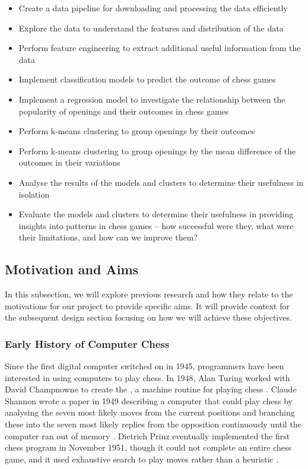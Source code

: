 \documentclass[a4paper, 11pt]{article}
\begin{document}
\begin{itemize}
    \setlength\itemsep{0em}
    \item Create a data pipeline for downloading and processing the data efficiently
    \item Explore the data to understand the features and distribution of the data
    \item Perform feature engineering to extract additional useful information from the data
    \item Implement classification models to predict the outcome of chess games
    \item Implement a regression model to investigate the relationship between the popularity of openings and their outcomes in chess games
    \item Perform k-means clustering to group openings by their outcomes
    \item Perform k-means clustering to group openings by the mean difference of the outcomes in their variations
    \item Analyse the results of the models and clusters to determine their usefulness in isolation
    \item Evaluate the models and clusters to determine their usefulness in providing insights into patterns in chess games -- how successful were they, what were their limitations, and how can we improve them?
\end{itemize}

\subsection{Motivation and Aims}
In this subsection, we will explore previous research and how they relate to the motivations for our project to provide specific aims. It will provide context for the subsequent design section focusing on how we will achieve these objectives.

\subsubsection{Early History of Computer Chess}
Since the first digital computer switched on in 1945, programmers have been interested in using computers to play chess. In 1948, Alan Turing worked with David Champnowne to create the , a machine routine for playing chess \cite{copeland2005turing}. Claude Shannon wrote a paper in 1949 describing a computer that could play chess by analysing the seven most likely moves from the current positions and branching these into the seven most likely replies from the opposition continuously until the computer ran out of memory \cite{shannon1950xxii}. Dietrich Prinz eventually implemented the first chess program in November 1951, though it could not complete an entire chess game, and it used exhaustive search to play moves rather than a heuristic \cite{copeland2005turing}.
\end{document}
